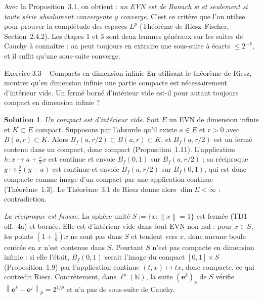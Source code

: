 \documentclass[11pt,a4paper]{article}
\newcommand{\N}{\mathbb{N}}
\newcommand{\Bf}{B_f}
\newcommand{\norm}[1]{\left\|#1\right\|}
\theoremstyle{definition}
\newtheorem*{solution}{Solution}
\begin{document}
\begin{pointcle}
Avec la Proposition~3.1, on obtient : \emph{un EVN est de Banach si et seulement si toute série absolument convergente y converge}. C'est ce critère que l'on utilise pour prouver la complétude des espaces $L^p$ (Théorème de Riesz--Fischer, Section~2.4.2). Les étapes 1 et 3 sont deux lemmes généraux sur les suites de Cauchy à connaître : on peut toujours en extraire une sous-suite à écarts $\le2^{-k}$, et il suffit qu'une sous-suite converge.
\end{pointcle}

\begin{exo}{Exercice 3.3 -- Compacts en dimension infinie}
En utilisant le théorème de Riesz, montrer qu'en dimension infinie une partie compacte est nécessairement d'intérieur vide. Un fermé borné d'intérieur vide est-il pour autant toujours compact en dimension infinie ?
\end{exo}

\begin{solution}
\emph{Un compact est d'intérieur vide.} Soit $E$ un EVN de dimension infinie et $K\subset E$ compact. Supposons par l'absurde qu'il existe $a\in E$ et $r>0$ avec $B(a,r)\subset K$. Alors $\Bf(a,r/2)\subset B(a,r)\subset K$, et $\Bf(a,r/2)$ est un fermé contenu dans un compact, donc compact (Proposition~1.11). L'application $h:x\mapsto a+\frac r2x$ est continue et envoie $\Bf(0,1)$ sur $\Bf(a,r/2)$ ; sa réciproque $y\mapsto\frac2r(y-a)$ est continue et envoie $\Bf(a,r/2)$ sur $\Bf(0,1)$, qui est donc compacte comme image d'un compact par une application continue (Théorème~1.3). Le Théorème~3.1 de Riesz donne alors $\dim E<\infty$ : contradiction.

\emph{La réciproque est fausse.} La sphère unité $S:=\{x : \norm x=1\}$ est fermée (TD1 off.~4a) et bornée. Elle est d'intérieur vide dans tout EVN non nul : pour $x\in S$, les points $(1+\frac1n)x$ ne sont pas dans $S$ et tendent vers $x$, donc aucune boule centrée en $x$ n'est contenue dans $S$. Pourtant $S$ n'est pas compacte en dimension infinie : si elle l'était, $\Bf(0,1)$ serait l'image du compact $[0,1]\times S$ (Proposition~1.9) par l'application continue $(t,x)\mapsto tx$, donc compacte, ce qui contredit Riesz. Concrètement, dans $\ell^p(\N)$, la suite $(\mathbf e^k)_k$ de $S$ vérifie $\norm{\mathbf e^k-\mathbf e^j}_p=2^{1/p}$ et n'a pas de sous-suite de Cauchy.
\end{solution}
\end{document}

